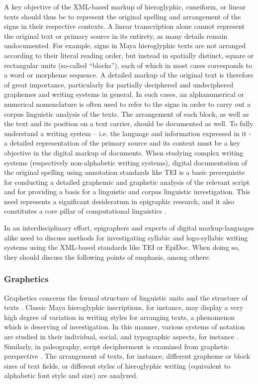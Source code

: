 \documentclass[amsthm,ebook]{saparticle}
\begin{document}
A key objective of the XML-based markup of hieroglyphic, cuneiform, or linear texts should thus be to represent the
original spelling and arrangement of the signs in their respective contexts. A linear transcription alone cannot
represent the original text or primary source in its entirety, as many details remain undocumented. For example, signs
in Maya hieroglyphic texts are not arranged according to their literal reading order, but instead in spatially
distinct, square or rectangular units (so-called ``blocks''), each of which in most cases corresponds to a word or
morpheme sequence. A detailed markup of the original text is therefore of great importance, particularly for partially
deciphered and undeciphered graphemes and writing systems in general. In such cases, an alphanumerical or numerical
nomenclature is often used to refer to the signs in order to carry out a corpus linguistic analysis of the texts. The
arrangement of each block, as well as the text and its position on a text carrier, should be documented as well. To
fully understand a writing system – i.e. the language and information expressed in it - a detailed representation of
the primary source and its context must be a key objective in the digital markup of documents. When studying complex
writing systems (respectively non-alphabetic writing systems), digital documentation of the original spelling using
annotation standards like TEI is a basic prerequisite for conducting a detailed graphemic and graphetic analysis of the
relevant script and for providing a basis for a linguistic and corpus linguistic investigation. This need represents a
significant desideratum in epigraphic research, and it also constitutes a core pillar of computational linguistics
\citep{McEneryWilson2001}. 

In an interdisciplinary effort, epigraphers and experts of digital markup-languages alike need to discuss methods for
investigating syllabic and logo-syllabic writing systems using the XML-based standards like TEI or EpiDoc. When doing
so, they should discuss the following points of emphasis, among others: 




\subsubsection[Graphetics ]{Graphetics }
Graphetics concerns the formal structure of linguistic units and the structure of texts \citep{Crystal1997}. Classic Maya
hieroglyphic inscriptions, for instance, may display a very high degree of variation in writing styles for arranging
texts, a phenomenon which is deserving of investigation. In this manner, various systems of notation are studied in
their individual, social, and typographic aspects, for instance \citep{Bussmann2002}. Similarly, in paleography, script
decipherment is examined from graphetic perspective \citep{Bussmann2002}. The arrangement of texts, for instance, different
grapheme or block sizes of text fields, or different styles of hieroglyphic writing (equivalent to alphabetic font
style and size) are analyzed. 
\end{document}
